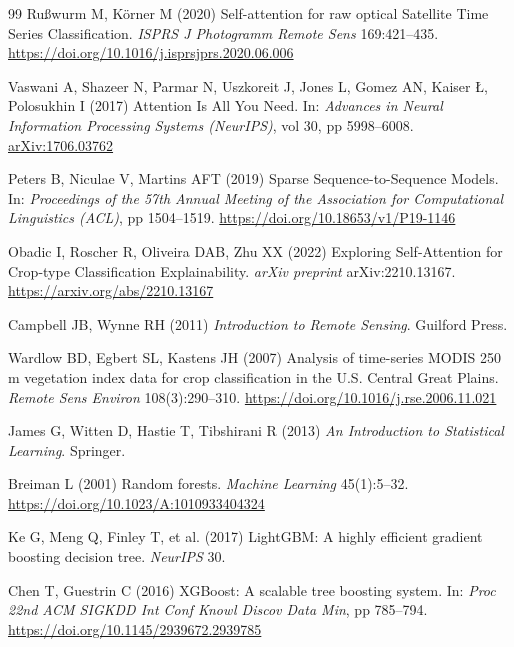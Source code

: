 \documentclass[pdflatex,sn-mathphys]{sn-jnl} %
\begin{document}
\begin{thebibliography}{99}
Ru\ss{}wurm M, K\"orner M (2020) Self-attention for raw optical Satellite Time Series Classification. \textit{ISPRS J Photogramm Remote Sens} 169:421--435. \href{https://doi.org/10.1016/j.isprsjprs.2020.06.006}{https://doi.org/10.1016/j.isprsjprs.2020.06.006}

Vaswani A, Shazeer N, Parmar N, Uszkoreit J, Jones L, Gomez AN, Kaiser \L{}, Polosukhin I (2017) Attention Is All You Need. In: \textit{Advances in Neural Information Processing Systems (NeurIPS)}, vol 30, pp 5998--6008. \href{https://arxiv.org/abs/1706.03762}{arXiv:1706.03762}

Peters B, Niculae V, Martins AFT (2019) Sparse Sequence-to-Sequence Models. In: \textit{Proceedings of the 57th Annual Meeting of the Association for Computational Linguistics (ACL)}, pp 1504--1519. \href{https://doi.org/10.18653/v1/P19-1146}{https://doi.org/10.18653/v1/P19-1146}

Obadic I, Roscher R, Oliveira DAB, Zhu XX (2022) Exploring Self-Attention for Crop-type Classification Explainability. \textit{arXiv preprint} arXiv:2210.13167. \href{https://arxiv.org/abs/2210.13167}{https://arxiv.org/abs/2210.13167}

Campbell JB, Wynne RH (2011) \textit{Introduction to Remote Sensing}. Guilford Press.
 
Wardlow BD, Egbert SL, Kastens JH (2007) Analysis of time-series MODIS 250 m vegetation index data for crop classification in the U.S. Central Great Plains. \textit{Remote Sens Environ} 108(3):290--310. \href{https://doi.org/10.1016/j.rse.2006.11.021}{https://doi.org/10.1016/j.rse.2006.11.021}

James G, Witten D, Hastie T, Tibshirani R (2013) \textit{An Introduction to Statistical Learning}. Springer.

Breiman L (2001) Random forests. \textit{Machine Learning} 45(1):5--32. \href{https://doi.org/10.1023/A:1010933404324}{https://doi.org/10.1023/A:1010933404324}


Ke G, Meng Q, Finley T, et al. (2017) LightGBM: A highly efficient gradient boosting decision tree. \textit{NeurIPS} 30.

Chen T, Guestrin C (2016) XGBoost: A scalable tree boosting system. In: \textit{Proc 22nd ACM SIGKDD Int Conf Knowl Discov Data Min}, pp 785--794. \href{https://doi.org/10.1145/2939672.2939785}{https://doi.org/10.1145/2939672.2939785}


\end{thebibliography}
\end{document}
